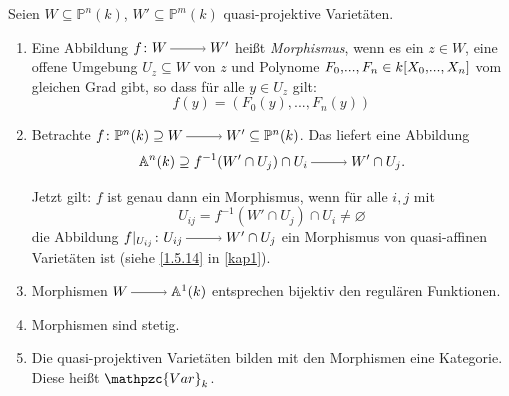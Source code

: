 \documentclass[a4paper,12pt]{scrbook}
\theoremstyle{keinenummern} %
\theoremstyle{mitnummern}
\theoremstyle{unserbeweis}
\def\A{\mathbb{A}}
\def\P{\mathbb{P}}
\newcommand{\Var}{\mathpzc{Var}}
\newcommand{\leer}{\ensuremath{\varnothing}}
\newcommand{\restrict}[1]{|_{#1}}
\renewcommand{\dotsc}{\ensuremath{\!...}}
\newcommand{\ra}{\raisebox{-1pt}{\tikz{\draw[thin,shorten >=3pt, ->] (0,0) node{\hspace*{-2pt}} -- node{} (1,0);}}\penalty1000\relax}
\newcommand{\ppolyx}[1][n]{\ensuremath%
  [X_{0},\dotsc,X_{#1}]}
\begin{document}
\begin{db}\label{2.6.1}
Seien $W\subseteq \P^n(k)$, $W'\subseteq \P^m(k)$ quasi-projektive Varietäten.
  \begin{enumerate}
  \item{} Eine Abbildung $f\colon W\ra W'$ heißt \emph{Morphismus}, wenn es ein $z \in W$, eine offene Umgebung $U_z \subseteq W$ von $z$ und Polynome $F_0,\dotsc,F_n \in k\ppolyx$ vom gleichen Grad gibt, so dass für alle $y \in U_z$ gilt:
\[f(y)=(F_0(y),\dotsc,F_n(y))\]
  \item{} Betrachte $f \colon \P^n(k)\supseteq W \ra W' \subseteq \P^n(k)$. Das liefert eine Abbildung 
  \[\A^n(k)\supseteq f^{-1}(W'\cap U_j) \cap U_i \ra W' \cap U_j.\] 

Jetzt gilt:
$f$ ist genau dann ein Morphismus, wenn für alle $i,j$ mit \[U_{ij}=f^{-1}(W'\cap U_j) \cap U_i \neq \leer\] die Abbildung $f\restrict{U_{ij}} \colon U_{ij} \ra W'\cap U_j$ ein Morphismus von quasi-affinen Varietäten ist (siehe \cref{1.5.14} in \cref{kap1}).
  \item{} Morphismen $W\ra \A^1(k)$ entsprechen bijektiv den regulären Funktionen.
  \item{} Morphismen sind stetig.
  \item{} Die quasi-projektiven Varietäten bilden mit den Morphismen eine Kategorie. Diese heißt $\Var_k$.
  \end{enumerate}
\end{db}
\end{document}
